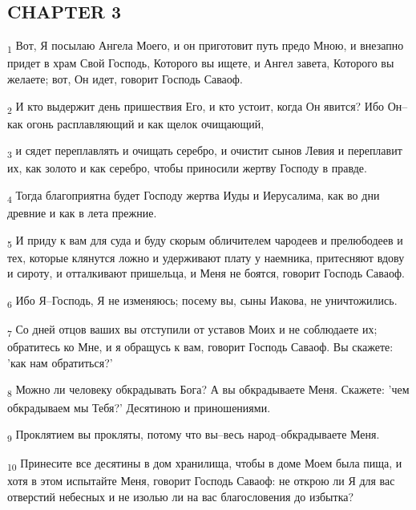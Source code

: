 \subsection{CHAPTER 3}
\begin{tcolorbox}
\textsubscript{1} Вот, Я посылаю Ангела Моего, и он приготовит путь предо Мною, и внезапно придет в храм Свой Господь, Которого вы ищете, и Ангел завета, Которого вы желаете; вот, Он идет, говорит Господь Саваоф.
\end{tcolorbox}
\begin{tcolorbox}
\textsubscript{2} И кто выдержит день пришествия Его, и кто устоит, когда Он явится? Ибо Он--как огонь расплавляющий и как щелок очищающий,
\end{tcolorbox}
\begin{tcolorbox}
\textsubscript{3} и сядет переплавлять и очищать серебро, и очистит сынов Левия и переплавит их, как золото и как серебро, чтобы приносили жертву Господу в правде.
\end{tcolorbox}
\begin{tcolorbox}
\textsubscript{4} Тогда благоприятна будет Господу жертва Иуды и Иерусалима, как во дни древние и как в лета прежние.
\end{tcolorbox}
\begin{tcolorbox}
\textsubscript{5} И приду к вам для суда и буду скорым обличителем чародеев и прелюбодеев и тех, которые клянутся ложно и удерживают плату у наемника, притесняют вдову и сироту, и отталкивают пришельца, и Меня не боятся, говорит Господь Саваоф.
\end{tcolorbox}
\begin{tcolorbox}
\textsubscript{6} Ибо Я--Господь, Я не изменяюсь; посему вы, сыны Иакова, не уничтожились.
\end{tcolorbox}
\begin{tcolorbox}
\textsubscript{7} Со дней отцов ваших вы отступили от уставов Моих и не соблюдаете их; обратитесь ко Мне, и я обращусь к вам, говорит Господь Саваоф. Вы скажете: 'как нам обратиться?'
\end{tcolorbox}
\begin{tcolorbox}
\textsubscript{8} Можно ли человеку обкрадывать Бога? А вы обкрадываете Меня. Скажете: 'чем обкрадываем мы Тебя?' Десятиною и приношениями.
\end{tcolorbox}
\begin{tcolorbox}
\textsubscript{9} Проклятием вы прокляты, потому что вы--весь народ--обкрадываете Меня.
\end{tcolorbox}
\begin{tcolorbox}
\textsubscript{10} Принесите все десятины в дом хранилища, чтобы в доме Моем была пища, и хотя в этом испытайте Меня, говорит Господь Саваоф: не открою ли Я для вас отверстий небесных и не изолью ли на вас благословения до избытка?
\end{tcolorbox}
